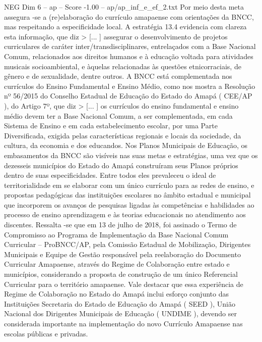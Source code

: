 \begin{textsample}{NEG Dim 6 – ap – Score -1.00 – ap/ap\_inf\_e\_ef\_2.txt}
Por meio desta meta assegura -se a (re)elaboração do currículo amapaense com orientações da BNCC, mas respeitando a especificidade local.
A estratégia 13.4 evidencia com clareza esta informação, que diz > [... ] assegurar o desenvolvimento de projetos curriculares de caráter inter/transdisciplinares, entrelaçados com a Base Nacional Comum, relacionados aos direitos humanos e à educação voltada para atividades musicais socioambiental, e àquelas relacionadas às questões etnicorraciais, de gênero e de sexualidade, dentre outros.
A BNCC está complementada nos currículos do Ensino Fundamental e Ensino Médio, como nos mostra a Resolução nº 56/2015 do Conselho Estadual de Educação do Estado do Amapá ( CEE/AP ), do Artigo 7º, que diz > [... ] os currículos do ensino fundamental e ensino médio devem ter a Base Nacional Comum, a ser complementada, em cada Sistema de Ensino e em cada estabelecimento escolar, por uma Parte Diversificada, exigida pelas características regionais e locais da sociedade, da cultura, da economia e dos educandos.
Nos Planos Municipais de Educação, os embasamentos da BNCC são visíveis nas suas metas e estratégias, uma vez que os dezesseis municípios do Estado do Amapá construíram seus Planos próprios dentro de suas especificidades.
Entre todos eles prevaleceu o ideal de territorialidade em se elaborar com um único currículo para as redes de ensino, e propostas pedagógicas das instituições escolares no âmbito estadual e municipal que incorporem os avanços de pesquisas ligadas às competências e habilidades ao processo de ensino aprendizagem e às teorias educacionais no atendimento aos discentes.
Ressalta -se que em 13 de julho de 2018, foi assinado o Termo de Compromisso ao Programa de Implementação da Base Nacional Comum Curricular – ProBNCC/AP, pela Comissão Estadual de Mobilização, Dirigentes Municipais e Equipe de Gestão responsável pela reelaboração do Documento Curricular Amapaense, através do Regime de Colaboração entre estado e municípios, considerando a proposta de construção de um único Referencial Curricular para o território amapaense.
Vale destacar que essa experiência de Regime de Colaboração no Estado do Amapá inclui esforço conjunto das Instituições Secretaria do Estado de Educação do Amapá ( SEED ), União Nacional dos Dirigentes Municipais de Educação ( UNDIME ), devendo ser considerada importante na implementação do novo Currículo Amapaense nas escolas públicas e privadas.

\end{textsample}
